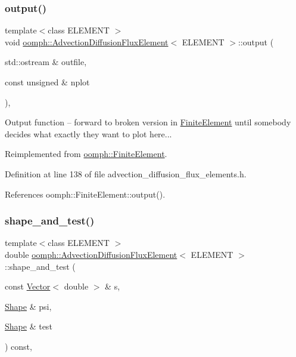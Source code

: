 \subsubsection{\texorpdfstring{output()}{output()}\hspace{0.1cm}{\footnotesize\ttfamily [2/2]}}
{\footnotesize\ttfamily template$<$class E\+L\+E\+M\+E\+NT $>$ \\
void \hyperlink{classoomph_1_1AdvectionDiffusionFluxElement}{oomph\+::\+Advection\+Diffusion\+Flux\+Element}$<$ E\+L\+E\+M\+E\+NT $>$\+::output (\begin{DoxyParamCaption}\item[{std\+::ostream \&}]{outfile,  }\item[{const unsigned \&}]{nplot }\end{DoxyParamCaption})\hspace{0.3cm}{\ttfamily [inline]}, {\ttfamily [virtual]}}



Output function -- forward to broken version in \hyperlink{classoomph_1_1FiniteElement}{Finite\+Element} until somebody decides what exactly they want to plot here... 



Reimplemented from \hyperlink{classoomph_1_1FiniteElement_afa9d9b2670f999b43e6679c9dd28c457}{oomph\+::\+Finite\+Element}.



Definition at line 138 of file advection\+\_\+diffusion\+\_\+flux\+\_\+elements.\+h.



References oomph\+::\+Finite\+Element\+::output().

\mbox{\label{classoomph_1_1AdvectionDiffusionFluxElement_a735b7f2134a85a1f856582f52ad773b1}} 
\subsubsection{\texorpdfstring{shape\+\_\+and\+\_\+test()}{shape\_and\_test()}}
{\footnotesize\ttfamily template$<$class E\+L\+E\+M\+E\+NT $>$ \\
double \hyperlink{classoomph_1_1AdvectionDiffusionFluxElement}{oomph\+::\+Advection\+Diffusion\+Flux\+Element}$<$ E\+L\+E\+M\+E\+NT $>$\+::shape\+\_\+and\+\_\+test (\begin{DoxyParamCaption}\item[{const \hyperlink{classoomph_1_1Vector}{Vector}$<$ double $>$ \&}]{s,  }\item[{\hyperlink{classoomph_1_1Shape}{Shape} \&}]{psi,  }\item[{\hyperlink{classoomph_1_1Shape}{Shape} \&}]{test }\end{DoxyParamCaption}) const\hspace{0.3cm}{\ttfamily [inline]}, {\ttfamily [protected]}}



